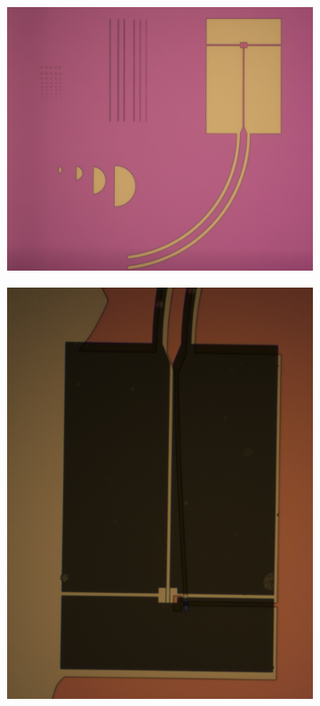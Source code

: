 \begin{figure}[h!]
    \centering
    \begin{subfigure}[b]{0.5\textwidth}
         \centering
         \includegraphics[width=1\textwidth]{Pic/Csar_postdev.png}
         \caption{}
         \label{}
     \end{subfigure}
     \hfill
     \begin{subfigure}[b]{0.5\textwidth}
         \centering
         \includegraphics[width=\textwidth]{Pic/Csar_postetch_resistfall.png}

\end{subfigure}
\end{figure}

